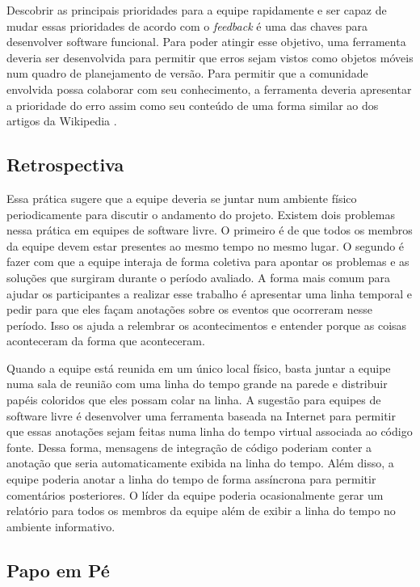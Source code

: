 Descobrir as principais prioridades para a equipe rapidamente e ser
capaz de mudar essas prioridades de acordo com o \emph{feedback} é uma
das chaves para desenvolver software funcional. Para poder atingir
esse objetivo, uma ferramenta deveria ser desenvolvida para permitir
que erros sejam vistos como objetos móveis num quadro de planejamento
de versão. Para permitir que a comunidade envolvida possa colaborar
com seu conhecimento, a ferramenta deveria apresentar a prioridade do
erro assim como seu conteúdo de uma forma similar ao dos artigos da
Wikipedia \cite{Surowiecki2004,Tapscott2006,Benkler2006}.

\subsection{Retrospectiva}
\label{subsec:retrospect}

Essa prática sugere que a equipe deveria se juntar num ambiente físico
periodicamente para discutir o andamento do projeto. Existem dois
problemas nessa prática em equipes de software livre. O primeiro é de
que todos os membros da equipe devem estar presentes ao mesmo tempo no
mesmo lugar. O segundo é fazer com que a equipe interaja de forma
coletiva para apontar os problemas e as soluções que surgiram durante
o período avaliado. A forma mais comum para ajudar os participantes a
realizar esse trabalho é apresentar uma linha temporal e pedir para
que eles façam anotações sobre os eventos que ocorreram nesse
período. Isso os ajuda a relembrar os acontecimentos e entender porque
as coisas aconteceram da forma que aconteceram.

Quando a equipe está reunida em um único local físico, basta juntar a
equipe numa sala de reunião com uma linha do tempo grande na parede e
distribuir papéis coloridos que eles possam colar na linha. A sugestão
para equipes de software livre é desenvolver uma ferramenta baseada na
Internet para permitir que essas anotações sejam feitas numa linha do
tempo virtual associada ao código fonte. Dessa forma, mensagens de
integração de código poderiam conter a anotação que seria
automaticamente exibida na linha do tempo. Além disso, a equipe
poderia anotar a linha do tempo de forma assíncrona para permitir
comentários posteriores. O líder da equipe poderia ocasionalmente
gerar um relatório para todos os membros da equipe além de exibir a
linha do tempo no ambiente informativo.

\subsection{Papo em Pé}
\label{subsec:stand-up}

